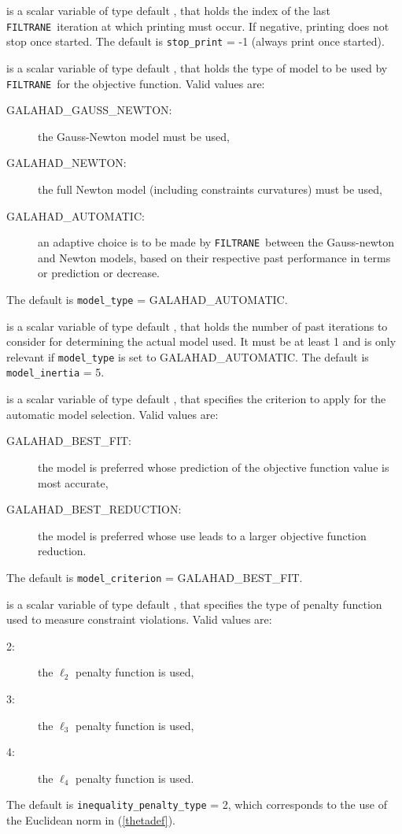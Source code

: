 \documentclass{galahad}
\newcommand{\packagename}{FILTRANE}
\newcommand{\sym}{\sf\small}
\newcommand{\filtrane}{{\tt \packagename}}
\begin{document}
\begin{description}
 is a scalar variable of type default \integer, that holds
the index of the last \filtrane\ iteration at which printing must occur. If
negative, printing does not stop once started.
The default is {\tt stop\_print} = -1 (always print once started).

 is a scalar variable of type default \integer, that holds
the type of model to be used by \filtrane\ for the objective function.  Valid
values are:
\begin{description}
\item[\sym GALAHAD\_GAUSS\_NEWTON:] the Gauss-Newton model must be used,
\item[\sym GALAHAD\_NEWTON:] the full Newton model (including constraints
curvatures) must be used,
\item[\sym GALAHAD\_AUTOMATIC:] an adaptive choice is to be made by 
\filtrane\ between the Gauss-newton and Newton models, based on their
respective past performance in terms or prediction or decrease.
\end{description}
The default is {\tt model\_type} = {\sym GALAHAD\_AUTOMATIC}.

 is a scalar variable of type default \integer, that holds
the number of past iterations to consider for determining the actual model
used. It must be at least 1 and is only relevant if {\tt model\_type}
is set to {\sym GALAHAD\_AUTOMATIC}.
The default is {\tt model\_inertia} = 5.

 is a scalar variable of type default \integer, that
specifies the criterion to apply for the automatic model selection. Valid
values are:
\begin{description}
\item[\sym GALAHAD\_BEST\_FIT:] the model is preferred whose prediction of the
objective function value is most accurate,
\item[\sym GALAHAD\_BEST\_REDUCTION:] the model is preferred whose use leads
to a larger objective function reduction.
\end{description}
The default is {\tt model\_criterion} = {\sym GALAHAD\_BEST\_FIT}.

 is a scalar variable of type default \integer,
that specifies the type of penalty function used to measure constraint
violations.  Valid values are:
\begin{description}
\item[2:] the $\ell_2$ penalty function is used,
\item[3:] the $\ell_3$ penalty function is used,
\item[4:] the $\ell_4$ penalty function is used.
\end{description}
The default is {\tt inequality\_penalty\_type} = 2, which corresponds to the
use of the Euclidean norm in (\ref{thetadef}).


\end{description}
\end{document}
